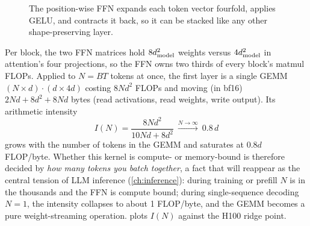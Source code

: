 \begin{figure}[t]
\centering
{}
\caption{The position-wise FFN expands each token vector fourfold, applies GELU, and contracts it
back, so it can be stacked like any other shape-preserving layer.}
\label{fig:gpt:ffn}
\end{figure}

\begin{systemslens}
Per block, the two FFN matrices hold $8d_{\text{model}}^2$ weights versus $4d_{\text{model}}^2$ in attention's
four projections, so the FFN owns two thirds of every block's matmul FLOPs. Applied to $N=BT$
tokens at once, the first layer is a single GEMM $(N\times d)\cdot(d\times 4d)$ costing $8Nd^2$
FLOPs and moving (in bf16) $2Nd+8d^2+8Nd$ bytes (read activations, read weights, write output).
Its arithmetic intensity
\[
I(N)=\frac{8Nd^2}{10Nd+8d^2}\ \xrightarrow{N\to\infty}\ 0.8\,d
\]
grows with the number of tokens in the GEMM and saturates at $0.8d$ FLOP/byte. Whether this
kernel is compute- or memory-bound is therefore decided by \emph{how many tokens you batch
together}, a fact that will reappear as the central tension of LLM inference (\cref{ch:inference}):
during training or prefill $N$ is in the thousands and the FFN is compute bound; during
single-sequence decoding $N=1$, the intensity collapses to about 1 FLOP/byte, and the GEMM becomes
a pure weight-streaming operation.  plots $I(N)$ against the H100 ridge
point.
\end{systemslens}


